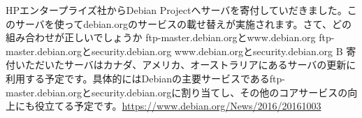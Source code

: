 %

\santaku
{HPエンタープライズ社からDebian Projectへサーバを寄付していだきました。このサーバを使ってdebian.orgのサービスの載せ替えが実施されます。さて、どの組み合わせが正しいでしょうか}
{ftp-master.debian.orgとwww.debian.org}
{ftp-master.debian.orgとsecurity.debian.org}
{www.debian.orgとsecurity.debian.org}
{B}
{寄付いただいたサーバはカナダ、アメリカ、オーストラリアにあるサーバの更新に利用する予定です。具体的にはDebianの主要サービスであるftp-master.debian.orgとsecurity.debian.orgに割り当てし、その他のコアサービスの向上にも役立てる予定です。\url{https://www.debian.org/News/2016/20161003}}
